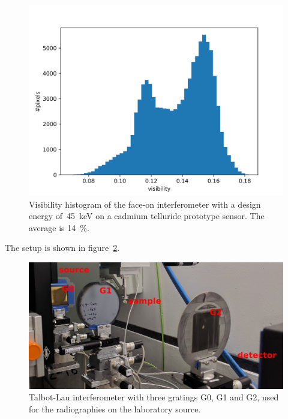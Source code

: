 \begin{figure}[htb]
    \centering
    \includegraphics[width=\textwidth]{gfx/visibility_titlis.png}
    \caption[Visibility of the face-on interferometer]{Visibility histogram
        of the face-on interferometer with a design energy
        of~\SI{45}{\kilo\eV} on a cadmium telluride prototype
        sensor. The average is
        \SI{14}{\percent}.}
    \label{fig:visibility-titlis}
\end{figure}

The setup is shown in figure~\ref{248327}.

\begin{figure}[htb]
    \centering
    \includegraphics[width=\columnwidth]{gfx/lung-paper-figures/lung-setup/lung-setup}
    \caption[Photo of the Talbot-Lau interferometer for lung radiographies]{Talbot-Lau interferometer with three gratings G0, G1 and G2, used for
        the radiographies on the laboratory source.
        {\label{248327}}%
    }
\end{figure}

